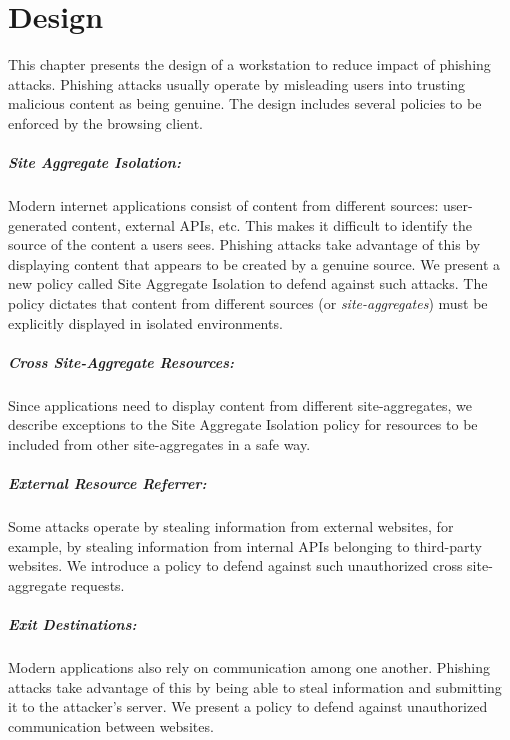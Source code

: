 \chapter{Design} \label{chap:design}

This chapter presents the design of a workstation to reduce impact of phishing attacks. Phishing attacks usually operate by misleading users into trusting malicious content as being genuine. The design includes several policies to be enforced by the browsing client.

\paragraph{Site Aggregate Isolation:} Modern internet applications consist of content from different sources: user-generated content, external APIs, etc. This makes it difficult to identify the source of the content a users sees. Phishing attacks take advantage of this by displaying content that appears to be created by a genuine source. We present a new policy called Site Aggregate Isolation to defend against such attacks. The policy dictates that content from different sources (or \textit{site-aggregates}) must be explicitly displayed in isolated environments.

\paragraph{Cross Site-Aggregate Resources:} Since applications need to display content from different site-aggregates, we describe exceptions to the Site Aggregate Isolation policy for resources to be included from other site-aggregates in a safe way.

\paragraph{External Resource Referrer:} Some attacks operate by stealing information from external websites, for example, by stealing information from internal APIs belonging to third-party websites. We introduce a policy to defend against such unauthorized cross site-aggregate requests.

\paragraph{Exit Destinations:} Modern applications also rely on communication among one another. Phishing attacks take advantage of this by being able to steal information and submitting it to the attacker's server. We present a policy to defend against unauthorized communication between websites.

